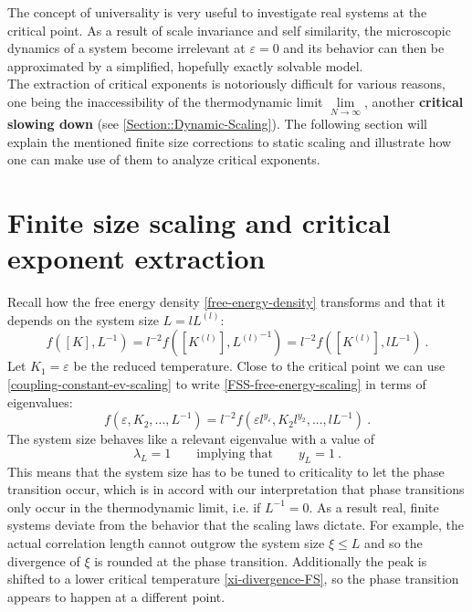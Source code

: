 	The concept of universality is very useful to investigate real systems at the critical point. As a result of scale invariance and self similarity, the microscopic dynamics of a system become irrelevant at $\varepsilon =	0$ and its behavior can then be approximated by a simplified, hopefully exactly solvable model. \\
	
	The extraction of critical exponents is notoriously difficult for various reasons, one being the inaccessibility of the thermodynamic limit $\lim\limits_{N \rightarrow \infty}$, another \textbf{critical slowing down} (see \autoref{Section::Dynamic-Scaling}). The following section will explain the mentioned finite size corrections to static scaling and illustrate how one can make use of them to analyze critical exponents.
	\section{Finite size scaling and critical exponent extraction} \label{Section::FSS}
	Recall how the free energy density \autoref{free-energy-density} transforms and that it depends on the system size $L = l L^{(l)}	$:
	\begin{equation}\label{FSS-free-energy-scaling}
		f\left([K], L^{-1}\right) =	l^{-2} f\left([K^{(l)}], {L^{(l)}}^{-1}\right) = l^{-2} f\left([K^{(l)}], l{L}^{-1}\right)	 ~.
	\end{equation}
	Let $K_1 =	\varepsilon$ be the reduced temperature. Close to the critical point we can use \autoref{coupling-constant-ev-scaling} to write \autoref{FSS-free-energy-scaling} in terms of eigenvalues:
	\begin{equation}
		f\left(\varepsilon, K_2, ..., L^{-1}\right) = l^{-2} f\left(\varepsilon l^{y_\varepsilon}, K_2 l^{y_2}, ..., l{L}^{-1}\right)	 ~.
	\end{equation} 
	The system size behaves like a relevant eigenvalue with a value of
	\begin{equation}
		\lambda_L =	1 \qquad \text{implying that} \qquad y_L =	1 ~.
	\end{equation}
	This means that the system size has to be tuned to criticality to let the phase transition occur, which is in accord with our interpretation that phase transitions only occur in the thermodynamic limit, i.e. if $L^{-1} =	0$. As a result real, finite systems deviate from the behavior that the scaling laws dictate. For example, the actual correlation length cannot outgrow the system size $\xi \leq L$ and so the divergence of $\xi$ is rounded at the phase transition. Additionally the peak is shifted to a lower critical temperature \autoref{xi-divergence-FS}, so the phase transition appears to happen at a different point. \\
